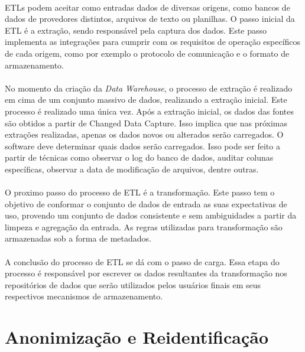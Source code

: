 \paragraph{} ETLs podem aceitar como entradas dados de diversas origens, como bancos de dados de provedores distintos, arquivos de texto ou planilhas. O passo inicial da ETL é a extração, sendo responsável pela captura dos dados. Este passo implementa as integrações para cumprir com os requisitos de operação específicos de cada origem, como por exemplo o protocolo de comunicação e o formato de armazenamento.

\paragraph{} No momento da criação da \textit{Data Warehouse}, o processo de extração é realizado em cima de um conjunto massivo de dados, realizando a extração inicial. Este processo é realizado uma única vez. \cite{kimball2008data} Após a extração inicial, os dados das fontes são obtidos a partir de Changed Data Capture. Isso implica que nas próximas extrações realizadas, apenas os dados novos ou alterados serão carregados. O software deve determinar quais dados serão carregados. Isso pode ser feito a partir de técnicas como observar o log do banco de dados, auditar colunas específicas, observar a data de modificação de arquivos, dentre outras.

\paragraph{} O proximo passo do processo de ETL é a transformação. Este passo tem o objetivo de conformar o conjunto de dados de entrada as suas expectativas de uso, provendo um conjunto de dados consistente e sem ambiguidades a partir da limpeza e agregação da entrada. As regras utilizadas para transformação são armazenadas sob a forma de metadados.

\paragraph{} A conclusão do processo de ETL se dá com o passo de carga. Essa etapa do processo é responsável por escrever os dados resultantes da transformação nos repositórios de dados que serão utilizados pelos usuários finais em seus respectivos mecanismos de armazenamento.

\section{Anonimização e Reidentificação}

